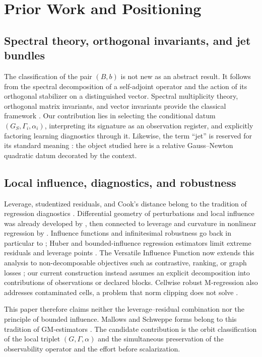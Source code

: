 \section{Prior Work and Positioning}
\label{sec:related-work}
\subsection{Spectral theory, orthogonal invariants, and jet bundles}
The classification of the pair $(B,b)$ is not new as an abstract result. It follows from the spectral decomposition of a self-adjoint operator and the action of its orthogonal stabilizer on a distinguished vector. Spectral multiplicity theory, orthogonal matrix invariants, and vector invariants provide the classical framework \citep{halmos1951,weyl1946,sibirskii1967,sibirskii1968,khadzhiev1967}. Our contribution lies in selecting the conditional datum $(G_S,\Gamma_i,\alpha_i)$, interpreting its signature as an observation register, and explicitly factoring learning diagnostics through it. Likewise, the term ``jet'' is reserved for its standard meaning \citep{saunders1989}: the object studied here is a relative Gauss--Newton quadratic datum decorated by the context.

\subsection{Local influence, diagnostics, and robustness}
Leverage, studentized residuals, and Cook's distance belong to the tradition of regression diagnostics \citep{cook1977}. Differential geometry of perturbations and local influence was already developed by \citet{cook1986}, then connected to leverage and curvature in nonlinear regression by \citet{stlaurent1993}. Influence functions and infinitesimal robustness go back in particular to \citet{hampel1974}; Huber and bounded-influence regression estimators limit extreme residuals and leverage points \citep{huber1964,mallows1975,krasker1982,richardson1997}. The Versatile Influence Function now extends this analysis to non-decomposable objectives such as contrastive, ranking, or graph losses \citep{deng2025vif}; our current construction instead assumes an explicit decomposition into contributions of observations or declared blocks. Cellwise robust M-regression also addresses contaminated cells, a problem that norm clipping does not solve \citep{filzmoser2020}.

This paper therefore claims neither the leverage--residual combination nor the principle of bounded influence. Mallows and Schweppe forms belong to this tradition of GM-estimators \citep{mallows1975,richardson1997,maronna2006robust}. The candidate contribution is the orbit classification of the local triplet $(G,\Gamma,\alpha)$ and the simultaneous preservation of the observability operator and the effort before scalarization.

